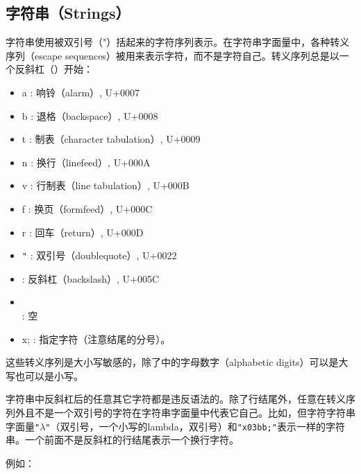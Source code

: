 \subsection{字符串（Strings）}

\vest 字符串使用被双引号（{\cf "}）括起来的字符序列表示。在字符串字面量中，各种转义序列（escape sequences）被用来表示字符，而不是字符自己。转义序列总是以一个反斜杠（\backwhack{}）开始：

\begin{itemize}
\item{\cf\backwhack{}a} : 响铃（alarm）, U+0007
\item{\cf\backwhack{}b} : 退格（backspace）, U+0008
\item{\cf\backwhack{}t} : 制表（character tabulation）, U+0009
\item{\cf\backwhack{}n} : 换行（linefeed）, U+000A
\item{\cf\backwhack{}v} : 行制表（line tabulation）, U+000B
\item{\cf\backwhack{}f} : 换页（formfeed）, U+000C
\item{\cf\backwhack{}r} : 回车（return）, U+000D
\item{\cf\backwhack{}}\verb|"| : 双引号（doublequote）, U+0022
\item{\cf\backwhack{}\backwhack{}} : 反斜杠（backslash）, U+005C
\item{\cf\backwhack{}}\\\hspace*{2em} : 空
\item{\cf\backwhack{}x;} : 指定字符（注意结尾的分号）。
\end{itemize}

这些转义序列是大小写敏感的，除了中的字母数字（alphabetic digits）可以是大写也可以是小写。

字符串中反斜杠后的任意其它字符都是违反语法的。除了行结尾外，任意在转义序列外且不是一个双引号的字符在字符串字面量中代表它自己。比如，但字符字符串字面量{\tt "$\lambda$"}（双引号，一个小写的lambda，双引号）和{\tt "\backwhack{}x03bb;"}表示一样的字符串。一个前面不是反斜杠的行结尾表示一个换行字符。

例如：

